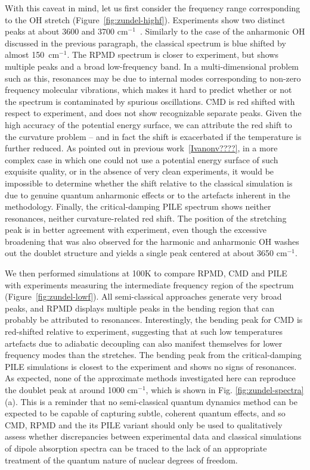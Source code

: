 \documentclass[aps,prb,superscriptaddress,amsmath,amssymb,showpacs,twocolumn]{revtex4}
\begin{document}
With this caveat in mind, let us first consider the frequency range corresponding 
to the OH stretch (Figure~\ref{fig:zundel-highf}). Experiments show two distinct peaks at about 
3600 and 3700 cm$^{-1}$~\cite{YehLee1989}. Similarly to the case of the anharmonic OH discussed 
in the previous paragraph, the classical spectrum is blue shifted by almost 
150~cm$^{-1}$. The RPMD spectrum is closer to experiment, but shows multiple peaks and a broad
low-frequency band. In a multi-dimensional problem such as this, resonances may be due to 
internal modes corresponding to non-zero frequency molecular vibrations, which makes it hard
to predict whether or not the spectrum is contaminated by spurious oscillations. 
CMD is red shifted with respect to experiment, and does not show recognizable separate peaks.
Given the high accuracy of the potential energy surface, we can attribute the red shift to the
curvature problem -- and in fact the shift is exacerbated if the temperature is further reduced. 
As pointed out in previous work~\ref{Ivanonv????}, in a more complex case in which one could not
use a potential energy surface of such exquisite quality, or in the absence of very clean 
experiments, it would be impossible to determine whether the shift relative to the classical
simulation is due to genuine quantum anharmonic effects or to the artefacts inherent in the methodology.
Finally, the critical-damping PILE spectrum shows neither resonances, neither curvature-related red shift. 
The position of the stretching peak  is in better agreement with experiment, even though the excessive 
broadening that was also observed for the harmonic and anharmonic
OH washes out the doublet structure and yields a single peak centered at about 3650 cm$^{-1}$.

We then performed simulations at 100K to compare RPMD, CMD and PILE with experiments
measuring the intermediate frequency region of the spectrum~\cite{AsmisScience2003} (Figure~\ref{fig:zundel-lowf}). 
All semi-classical approaches generate very broad peaks, and RPMD 
displays multiple peaks in the bending region that can probably be attributed to resonances.
Interestingly, the bending peak for CMD is red-shifted relative to experiment, suggesting 
that at such low temperatures artefacts due to adiabatic decoupling can also manifest themselves 
for lower frequency modes than the stretches. The bending peak from the critical-damping
PILE simulations is closest to the experiment and shows no signs of resonances.
As expected, none of the approximate methods investigated here can reproduce the
doublet peak at around 1000 cm$^{-1}$, which is shown in Fig. \ref{fig:zundel-spectra}(a).
This is a reminder that no semi-classical quantum dynamics method can be expected to be capable
of capturing subtle, coherent quantum effects, and so CMD, RPMD and the its PILE variant should
only be used to qualitatively assess whether discrepancies between experimental data and 
classical simulations of dipole absorption spectra can be traced to the lack of an
appropriate treatment of the quantum nature of nuclear degrees of freedom.
\end{document}
